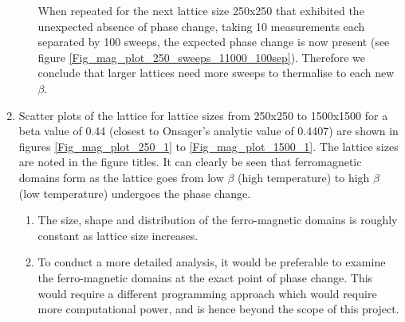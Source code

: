 \documentclass[a4paper]{article}
\begin{document}
\begin{enumerate}
\begin{enumerate}
	 	When repeated for the next lattice size 250x250 that exhibited the unexpected absence of phase change, taking 10 measurements each separated by 100 sweeps, the expected phase change is now present (see figure \ref{Fig_mag_plot_250_sweeps_11000_100sep}). Therefore we conclude that larger lattices need more sweeps to thermalise to each new $\beta$.
	\end{enumerate}

	\item Scatter plots of the lattice for lattice sizes from 250x250 to 1500x1500 for a beta value of 0.44 (closest to Onsager's analytic value of 0.4407) are shown in figures \ref{Fig_mag_plot_250_1} to \ref{Fig_mag_plot_1500_1}. The lattice sizes are noted in the figure titles. It can clearly be seen that ferromagnetic domains form as the lattice goes from low $\beta$ (high temperature) to high $\beta$ (low temperature) undergoes the phase change. \label{Scatter_plots}
		\begin{enumerate}
			\item The size, shape and distribution of the ferro-magnetic domains is roughly constant as lattice size increases. 
			\item To conduct a more detailed analysis, it would be preferable to examine the ferro-magnetic domains at the exact point of phase change. This would require a different programming approach which would require more computational power, and is hence beyond the scope of this project.
		\end{enumerate}


\end{enumerate}
\end{document}
